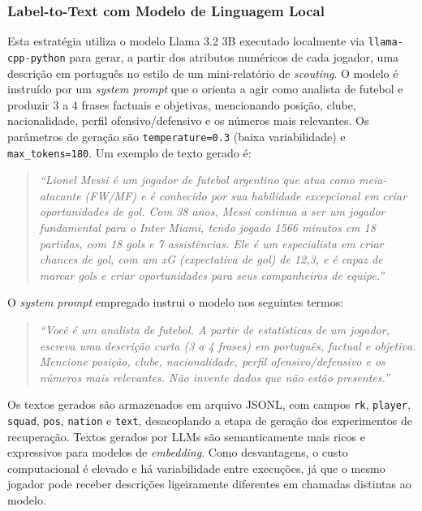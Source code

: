 \documentclass[portuguese]{sbc2025}
\begin{document}
\subsubsection{Label-to-Text com Modelo de Linguagem Local}
\label{subsec:llm}

Esta estratégia utiliza o modelo Llama 3.2 3B executado localmente via
\texttt{llama-cpp-python} para gerar, a partir dos atributos numéricos de cada jogador,
uma descrição em português no estilo de um mini-relatório de \textit{scouting}. O
modelo é instruído por um \textit{system prompt} que o orienta a agir como analista
de futebol e produzir 3 a 4 frases factuais e objetivas, mencionando posição, clube,
nacionalidade, perfil ofensivo/defensivo e os números mais relevantes. Os parâmetros
de geração são \texttt{temperature=0.3} (baixa variabilidade) e
\texttt{max\_tokens=180}. Um exemplo de texto gerado é:

\begin{quotation}
\textit{``Lionel Messi é um jogador de futebol argentino que atua como meia-atacante
(FW/MF) e é conhecido por sua habilidade excepcional em criar oportunidades de gol.
Com 38 anos, Messi continua a ser um jogador fundamental para o Inter Miami, tendo
jogado 1566 minutos em 18 partidas, com 18 gols e 7 assistências. Ele é um especialista
em criar chances de gol, com um xG (expectativa de gol) de 12,3, e é capaz de marcar
gols e criar oportunidades para seus companheiros de equipe.''}
\end{quotation}

O \textit{system prompt} empregado instrui o modelo nos seguintes termos:

\begin{quotation}
\textit{``Você é um analista de futebol. A partir de estatísticas de um jogador,
escreva uma descrição curta (3 a 4 frases) em português, factual e objetiva.
Mencione posição, clube, nacionalidade, perfil ofensivo/defensivo e os números
mais relevantes. Não invente dados que não estão presentes.''}
\end{quotation}

Os textos gerados são armazenados em arquivo JSONL, com campos \texttt{rk},
\texttt{player}, \texttt{squad}, \texttt{pos}, \texttt{nation} e \texttt{text},
desacoplando a etapa de geração dos experimentos de recuperação. Textos gerados por
LLMs são semanticamente mais ricos e expressivos para modelos de \textit{embedding}.
Como desvantagens, o custo computacional é elevado e há variabilidade entre execuções,
já que o mesmo jogador pode receber descrições ligeiramente diferentes em chamadas
distintas ao modelo.
\end{document}
